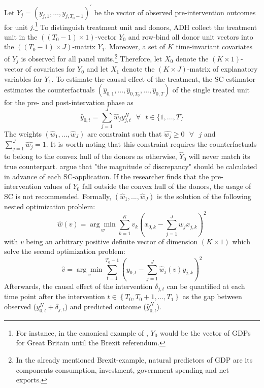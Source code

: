 Let $Y_j = (y_{j,1}, ..., y_{j,T_{0}-1})^\prime$ be the vector of observed pre-intervention outcomes for unit $j$.\footnote{For instance, in the canonical example of \cite{abadie:2003}, $Y_0$ would be the vector of \ac{GDP}s for Great Britain until the Brexit referendum.} To distinguish treatment unit and donors, \ac{ADH} collect the treatment unit in the $((T_{0}-1) \times 1) $-vector $Y_0$ and row-bind all donor unit vectors into the $((T_{0}-1) \times J)$-matrix $Y_1$. Moreover, a set of $K$ time-invariant covariates of $Y_j$ is observed for all panel units.\footnote{In the already mentioned Brexit-example, natural predictors of \ac{GDP} are its components consumption, investment, government spending and net exports.} Therefore, let $X_0$ denote the $(K \times 1)$-vector of covariates for $Y_0$ and let $X_1$ denote the $(K \times J)$-matrix of explanatory variables for $Y_1$. To estimate the causal effect of the treatment, the \ac{SC}-estimator estimates the counterfactuals $(\widehat{y}_{0,1}, ...,\widehat{y}_{0,T_0},..., \widehat{y}_{0,T})$ of the single treated unit for the pre- and post-intervation phase as 
\[
\widehat{y}_{0,t} = \sum_{j = 1}^{J} \widehat{w}_j y^{N}_{j,t} \text{ } \forall \text{ } t \in \{1,...,T\}
\]
The weights $(\widehat{w}_1, ... , \widehat{w}_J)$ are constraint such that $\widehat{w_j} \geq 0 \text{ } \forall \text{ } j$ and $\sum_{j = 1}^{J} \widehat{w_j} = 1$. It is worth noting that this constraint requires the counterfactuals to belong to the convex hull of the donors as otherwise, $\widehat{Y}_{0}$ will never match its true counterpart. \cite{abadie:2010} argue that "the magnitude of discrepancy" should be calculated in advance of each \ac{SC}-application. If the researcher finds that the pre-intervention values of ${Y}_{0}$ fall outside the convex hull of the donors, the usage of \ac{SC} is not recommended. Formally, $(\widehat{w}_1, ... , \widehat{w}_J)$ is the solution of the following nested optimization problem:
\[
\widehat{w}(v) = 
\underset{w}{\arg\min}
\sum_{k = 1}^{K} v_k \left(x_{0,k} - \sum_{j = 1}^{J} w_j x_{j,k} \right)^2 
\]
with $v$ being an arbitrary positive definite vector of dimension $(K \times 1)$ which solve the second optimization problem:
\[
\widehat{v} = 
\underset{v}{\arg\min}
\sum_{t = 1}^{T_0 - 1} \left(y_{0,t} - \sum_{j = 1}^{J}  \widehat{w}_j(v) y_{j,k} \right)^2
\]
Afterwards, the causal effect of the intervention $\delta_{j,t}$ can be quantified at each time point after the intervention $t \in \left\lbrace T_{0},T_{0}+1, ..., T_{1}\right\rbrace $ as the gap between observed ($y^{N}_{0,t} + \delta_{j,t}$) and predicted outcome ($\widehat{y}^{N}_{0,t}$).

